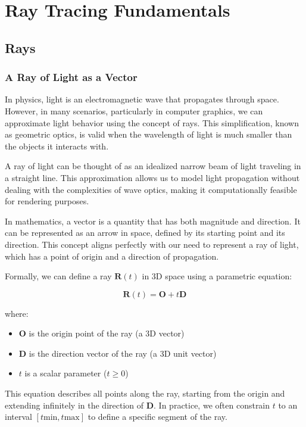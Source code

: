 \documentclass[12pt]{article}
\begin{document}
\section{Ray Tracing Fundamentals}
\label{sec:fundamentals}

\subsection{Rays}
\subsubsection{A Ray of Light as a Vector}
In physics, light is an electromagnetic wave that propagates through space. However, in many scenarios, particularly in computer graphics, we can approximate light behavior using the concept of rays. This simplification, known as geometric optics, is valid when the wavelength of light is much smaller than the objects it interacts with.

A ray of light can be thought of as an idealized narrow beam of light traveling in a straight line. This approximation allows us to model light propagation without dealing with the complexities of wave optics, making it computationally feasible for rendering purposes.

In mathematics, a vector is a quantity that has both magnitude and direction. It can be represented as an arrow in space, defined by its starting point and its direction. This concept aligns perfectly with our need to represent a ray of light, which has a point of origin and a direction of propagation.

Formally, we can define a ray \(\mathbf{R}(t)\) in 3D space using a parametric equation:

\[
    \mathbf{R}(t) = \mathbf{O} + t\mathbf{D}
\]

where:
\begin{itemize}
    \item \(\mathbf{O}\) is the origin point of the ray (a 3D vector)
    \item \(\mathbf{D}\) is the direction vector of the ray (a 3D unit vector)
    \item \(t\) is a scalar parameter (\(t \geq 0\))
\end{itemize}

This equation describes all points along the ray, starting from the origin and extending infinitely in the direction of \(\mathbf{D}\). In practice, we often constrain \(t\) to an interval \([t{\text{min}}, t{\text{max}}]\) to define a specific segment of the ray.
\end{document}
